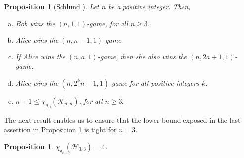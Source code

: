 \documentclass{article}
\newtheorem{prop}[thm]{Proposition}
\newcommand{\chib}{\ensuremath{\chi_{g_B}}}
\begin{document}
\begin{prop}[Schlund \cite{Schlund2011}]\label{Schlund} Let $n$ be a positive integer. Then,
\begin{enumerate}[a)]
\item Bob wins the $(n,1,1)$-game, for all $n\geq 3$.
\item Alice wins the $(n,n-1,1)$-game.
\item If Alice wins the $(n,a,1)$-game, then she also wins the $(n,2a+1,1)$-game.
\item Alice wins the $(n,2^kn-1,1)$-game for all positive integers $k$.
\item $n+1\leq \chi_{g_B}(\mathcal{H}_{n,n})$, for all $n\geq 3$.
\end{enumerate}
\end{prop}

\vspace{0.2cm}

The next result enables us to ensure that the lower bound exposed in the last assertion in Proposition \ref{Schlund} is tight for $n=3$.

\begin{prop} \label{prop_Hnn} $\chib(\mathcal{H}_{3,3})=4$.
\end{prop}
\end{document}
